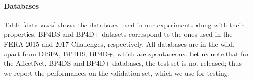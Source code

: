 \documentclass{bmvc2k}
\begin{document}
\begin{table}[h]
\caption{Network Configurations: ST= Single Task, MT=Multi-Task} 
\label{hyper}
\centering
{}
\end{table}


\paragraph{Databases} 
Table \ref{databases} shows the databases used in our experiments along with their properties. BP4DS and BP4D+ datasets correspond to the ones used in the FERA 2015 \cite{valstar2015fera} and 2017 \cite{valstar2017fera} Challenges, respectively. All databases are in-the-wild, apart from DISFA, BP4DS, BP4D+, which are spontaneous. Let us note that for the AffectNet, BP4DS and BP4D+ databases, the test set is not released; thus we report the performances on the validation set, which we use for testing.
\end{document}
